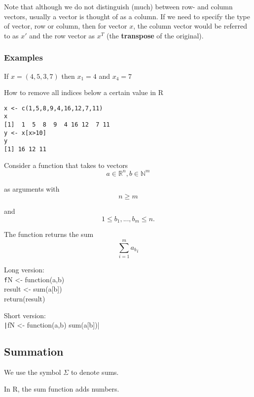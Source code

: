 \documentclass[12pt,a4paper]{article}
\theoremstyle{regla}
\theoremstyle{remark}
\theoremstyle{definition}
\theoremstyle{nonumberbreak}
\begin{document}
Note that although we do not distinguish (much) between row- and column vectors, usually a vector is thought of as a column. If we need to specify the type of vector, row or column, then for vector $x$, the column vector would be referred to as  $x'$ and the row vector as $x^T$ (the {\bf transpose} of the original).
\subsubsection{Examples}
\begin{xmpl}
If $x=(4,5,3,7)$ then $x_1=4$ and $x_4=7$

\end{xmpl}
\begin{xmpl}
How to remove all indices below a certain value in R
\begin{lstlisting}
x <- c(1,5,8,9,4,16,12,7,11)
x
[1]  1  5  8  9  4 16 12  7 11
y <- x[x>10]
y
[1] 16 12 11
\end{lstlisting}
\end{xmpl}

\begin{xmpl}
Consider a function that takes to vectors $$a \in \mathbb{R}^n, b \in \mathbb{N}^m$$

as arguments with $$n \ge m$$

and $$1 \le b_1,...,b_m \le n.$$

The function returns the sum \begin{equation}\sum_{i = 1}^m {a_b}_i \end{equation}

Long version:\\
\texttt
fN <- function(a,b) {			\\
	result <- sum(a[b])		\\
	return(result)\\
}


Short version:\\
\texttt|fN <- function(a,b) sum(a[b])|


\end{xmpl}


\subsection{Summation}
\begin{fbox}
\begin{minipage}{0.97\textwidth}
We use the symbol $\Sigma$ to denote sums.

In R, the sum function adds numbers.
\end{minipage}
\end{fbox}
\end{document}
